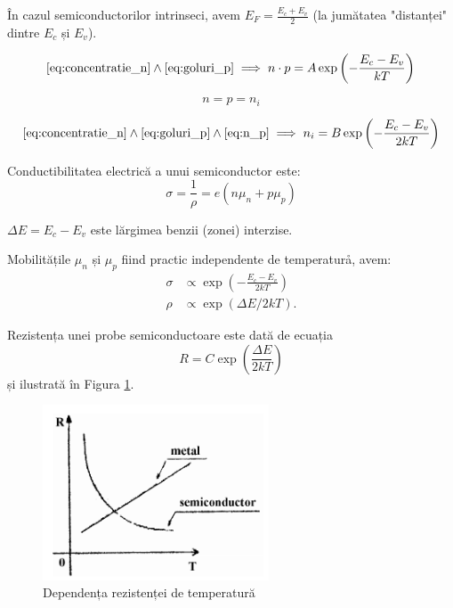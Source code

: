 \documentclass{article}
\begin{document}
În cazul semiconductorilor intrinseci, avem $E_F = \frac{E_c + E_v}{2}$ (la
jumătatea "distanței" dintre $E_c$ și $E_v$). %

\begin{equation}
	\eqref{eq:concentratie_n} \land \eqref{eq:goluri_p} \implies
	n \cdot p = A \exp\left( - \frac{E_c - E_v}{kT} \right)
\end{equation}

\begin{equation}
	n = p = n_i \label{eq:n_p}
\end{equation}

\begin{equation}
	\eqref{eq:concentratie_n} \land \eqref{eq:goluri_p} \land \eqref{eq:n_p}
	\implies n_i = B \exp\left( - \frac{E_c - E_v}{2kT} \right)
\end{equation}

Conductibilitatea electrică a unui semiconductor este:
\begin{equation}
	\sigma = \frac{1}{\rho} = e(n\mu_n + p\mu_p)
\end{equation}

$\Delta E = E_c - E_v$ este lărgimea benzii (zonei) interzise.

Mobilitățile $\mu_n$ și $\mu_p$ fiind practic independente de temperaturå, avem:
\begin{equation}
	\begin{aligned}
		\sigma & \propto \exp\left( - \frac{E_c - E_v}{2kT} \right) \\
		\rho   & \propto \exp\left( \Delta E / 2kT \right)
		\text{.}
	\end{aligned}
\end{equation}

Rezistența unei probe semiconductoare este dată de ecuația
\begin{equation}
	R = C \exp\left( \frac{\Delta E}{2kT} \right)
	\label{eq:rezistenta}
\end{equation}
și ilustrată în Figura \ref{fig:grafic_RT}.

\begin{figure}[htbp]
	\centering
	\includegraphics[width=0.6\textwidth]{rez-temp.png}
	\caption{Dependența rezistenței de temperatură}
	\label{fig:grafic_RT}
\end{figure}
\end{document}
